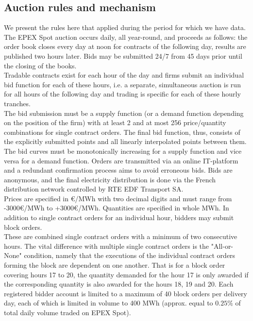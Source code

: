 \subsection{Auction rules and mechanism}
\label{epexrules}
We present the rules here that applied during the period for which we have data. \\

The EPEX Spot auction occurs daily, all year-round, and proceeds as follows: the order book closes every day at noon for contracts of the following day, results are published two hours later. Bids may be submitted 24/7 from 45 days prior until the closing of the books. \\

Tradable contracts exist for each hour of the day and firms submit an individual bid function for each of these hours, i.e. a separate, simultaneous auction is run for all hours of the following day and trading is specific for each of these hourly tranches.  \\

The bid submission must be a supply function (or a demand function depending on the position of the firm) with at least 2 and at most 256 price/quantity combinations for single contract orders. The final bid function, thus, consists of the explicitly submitted points and all linearly interpolated points between them. The bid curves must be monotonically increasing for a supply function and vice versa for a demand function. Orders are transmitted via an online IT-platform and a redundant confirmation process aims to avoid erroneous bids. Bids are anonymous, and the final electricity distribution is done via the French distribution network controlled by RTE EDF Transport SA.\\ 

Prices are specified in \euro{}/MWh with two decimal digits and must range from -3000\euro{}/MWh to +3000\euro{}/MWh. Quantities are specified in whole MWh. In addition to single contract orders for an individual hour, bidders may submit block orders. \\

These are combined single contract orders with a minimum of two consecutive hours. The vital difference with multiple single contract orders is the "All-or-None" condition, namely that the executions of the individual contract orders forming the block are dependent on one another. That is for a block order covering hours 17 to 20, the quantity demanded for the hour 17 is only awarded if the corresponding quantity is also awarded for the hours 18, 19 and 20. Each registered bidder account is limited to a maximum of 40 block orders per delivery day, each of which is limited in volume to 400 MWh (approx. equal to $0.25\%$ of total daily volume traded on EPEX Spot). \\

